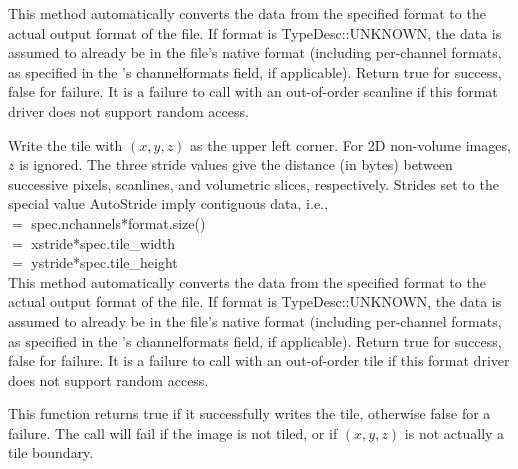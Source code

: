This method automatically converts the data from the specified {\kw format}
to the actual output format of the file.  
If {\cf format} is {\cf TypeDesc::UNKNOWN}, the data is assumed to
already be in the file's native format (including per-channel formats, 
as specified in the \ImageSpec's {\cf channelformats} field, if applicable).
Return {\kw true} for success, {\kw false} for failure.  
It is a failure to call \writescanline with an
out-of-order scanline if this format driver does not support random
access.
\apiend


Write the tile with $(x,y,z)$ as the upper left corner.  For 2D
non-volume images, $z$ is ignored.  The three stride values give the
distance (in bytes) between successive pixels, scanlines, and volumetric
slices, respectively.  Strides set to the special value {\kw AutoStride}
imply contiguous data, i.e., \\
 $=$ {\kw spec.nchannels*format.size()} \\
 $=$ {\kw xstride*spec.tile_width} \\
 $=$ {\kw ystride*spec.tile_height} \\
This method automatically converts the
data from the specified {\kw format} to the actual output format of the
file. 
If {\cf format} is {\cf TypeDesc::UNKNOWN}, the data is assumed to
already be in the file's native format (including per-channel formats, 
as specified in the \ImageSpec's {\cf channelformats} field, if applicable).
Return {\kw true} for success, {\kw false} for failure.  It is a
failure to call \writetile with an out-of-order tile if this
format driver does not support random access.

This function returns {\cf true} if it successfully writes the tile,
otherwise {\cf false} for a failure.
The call will fail if the image is not tiled, or if $(x,y,z)$ is not
actually a tile boundary.
\apiend


